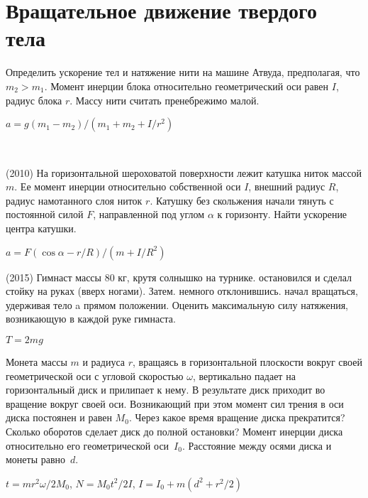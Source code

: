 \section{Вращательное движение твердого тела}

\begin{ex}
Определить ускорение тел и натяжение нити на машине Атвуда, предполагая, что $m_2>m_1$. Момент инерции блока относительно геометрический оси равен $I$, радиус блока $r$. Массу нити считать пренебрежимо малой. 
\begin{ans}
$a=g(m_1-m_2)/(m_1 +m_2 + I/r^2)$
\end{ans}
\end{ex}

\begin{ex}
\hspace{0pt} \\
\begin{minipage}{.65\textwidth}
(2010) На горизонтальной шероховатой поверхности лежит катушка ниток массой $m$. Ее момент инерции относительно собственной оси $I$, внешний радиус $R$, радиус намотанного слоя ниток $r$. Катушку без скольжения начали тянуть с постоянной силой $F$, направленной под углом $\alpha$ к горизонту. Найти ускорение центра катушки.
\end{minipage}
\begin{minipage}{.35\textwidth}
\centering

\end{minipage}
\begin{ans}
$a = F(\cos \alpha - r/R)/(m+I/R^2)$
\end{ans}
\end{ex}

\begin{ex}
(2015) Гимнаст массы 80 кг, крутя солнышко на турнике. остановился и сделал стойку на руках (вверх ногами). Затем. немного отклонившись. начал вращаться, удерживая тело a прямом положении. Оценить максимальную силу натяжения, возникающую в каждой руке гимнаста.
\begin{ans}
$T=2mg$
\end{ans}
\end{ex}

\begin{ex}
Монета массы $m$ и радиуса $r$, вращаясь в горизонтальной плоскости вокруг своей геометрической оси с угловой скоростью $\omega$, вертикально падает на горизонтальный диск и прилипает к нему. В результате диск приходит во вращение вокруг своей оси. Возникающий при этом момент сил трения в оси диска постоянен и равен $M_0$. Через какое время вращение диска прекратится? Сколько оборотов сделает диск до полной остановки? Момент инерции диска относительно его геометрической оси~$I_0$. Расстояние между осями диска и монеты равно~$d$.
\begin{ans}
$t=mr^2\omega/2M_0$, $N=M_0t^2/2I$, $I = I_0+m(d^2+r^2/2)$
\end{ans}
\end{ex}

